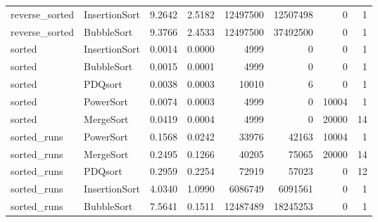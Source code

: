 \begin{table}[htbp]
{\begin{tabular}{llrrrrrr}
reverse\_sorted & InsertionSort & 9.2642 & 2.5182 & 12497500 & 12507498 & 0 & 1 \\
reverse\_sorted & BubbleSort & 9.3766 & 2.4533 & 12497500 & 37492500 & 0 & 1 \\
sorted & InsertionSort & 0.0014 & 0.0000 & 4999 & 0 & 0 & 1 \\
sorted & BubbleSort & 0.0015 & 0.0001 & 4999 & 0 & 0 & 1 \\
sorted & PDQsort & 0.0038 & 0.0003 & 10010 & 6 & 0 & 1 \\
sorted & PowerSort & 0.0074 & 0.0003 & 4999 & 0 & 10004 & 1 \\
sorted & MergeSort & 0.0419 & 0.0004 & 4999 & 0 & 20000 & 14 \\
sorted\_runs & PowerSort & 0.1568 & 0.0242 & 33976 & 42163 & 10004 & 1 \\
sorted\_runs & MergeSort & 0.2495 & 0.1266 & 40205 & 75065 & 20000 & 14 \\
sorted\_runs & PDQsort & 0.2959 & 0.2254 & 72919 & 57023 & 0 & 12 \\
sorted\_runs & InsertionSort & 4.0340 & 1.0990 & 6086749 & 6091561 & 0 & 1 \\
sorted\_runs & BubbleSort & 7.5641 & 0.1511 & 12487489 & 18245253 & 0 & 1 \\
\hline
\end{tabular}%
}
\end{table}
